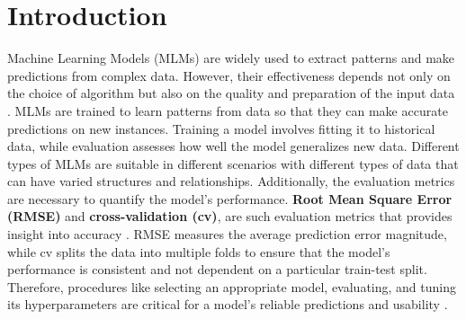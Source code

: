 \documentclass[conference]{IEEEtran}
\begin{document}
\section{Introduction}
Machine Learning Models (MLMs) are widely used to extract patterns and make predictions from complex data\cite{geeksforgeeks}. However, their effectiveness depends not only on the choice of algorithm but also on the quality and preparation of the input data \cite{geron2022hands}. MLMs are trained to learn patterns from data so that they can make accurate predictions on new instances. Training a model involves fitting it to historical data, while evaluation assesses how well the model generalizes new data. Different types of MLMs are suitable in different scenarios with different types of data that can have varied structures and relationships. Additionally, the evaluation metrics are necessary to quantify the model's performance. \textbf{Root Mean Square Error (RMSE)} and \textbf{cross-validation (cv)}, are such evaluation metrics that provides insight into accuracy \cite{geron2022hands}. RMSE measures the average prediction error magnitude, while cv splits the data into multiple folds to ensure that the model's performance is consistent and not dependent on a particular train-test split. Therefore, procedures like selecting an appropriate model, evaluating, and tuning its hyperparameters are critical for a model's reliable predictions and usability \cite{geron2022hands}.   

\end{document}
